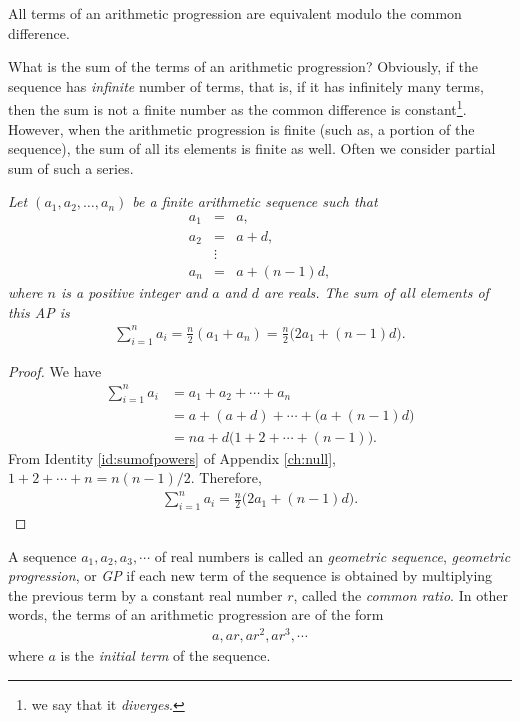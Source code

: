 \documentclass{subfile}
\begin{document}
	\begin{corollary}
		All terms of an arithmetic progression are equivalent modulo the common difference.
	\end{corollary}
What is the sum of the terms of an arithmetic progression? Obviously, if the sequence has \textit{infinite} number of terms, that is, if it has infinitely many terms, then the sum is not a finite number as the common difference is constant\footnote{we say that it \textit{diverges}.}. However, when the arithmetic progression is finite (such as, a portion of the sequence), the sum of all its elements is finite as well. Often we consider partial sum of such a series.
	\begin{theorem}\slshape
		Let $(a_1,a_2,\ldots,a_n)$ be a finite arithmetic sequence such that
			\begin{eqnarray*}
				a_1 & = & a,\\
				a_2 & = & a+d,\\
					& \vdots &\\
				a_n & = & a+ (n-1)d,
			\end{eqnarray*}
		where $n$ is a positive integer and $a$ and $d$ are reals. The sum of all elements of this AP is
			\begin{align*}
				\sum_{i=1}^{n} a_i = \frac{n}{2} \left(a_1+a_n\right) = \frac{n}{2} \big(2a_1 + (n-1)d\big).
			\end{align*}
	\end{theorem}
	
	\begin{proof}
		We have
			\begin{align*}
				\sum_{i=1}^{n} a_i &= a_1 + a_2 + \cdots + a_n \\
								   &= a + (a+d) + \cdots + \Big(a+ (n-1)d\Big)\\
								   &= na + d\Big(1+2+\cdots+ (n-1)\Big).
			\end{align*}
		From Identity \ref{id:sumofpowers} of Appendix \eqref{ch:null}, $1+2+\cdots+n = n(n-1)/2$. Therefore,
			\begin{align*}
				\sum_{i=1}^{n} a_i = \frac{n}{2} \big(2a_1 + (n-1)d\big).
			\end{align*}
	\end{proof}
	
	\begin{definition}
		A sequence $a_1, a_2, a_3, \cdots$ of real numbers is called an \textit{geometric sequence}, \textit{geometric progression}, or \textit{GP} if each new term of the sequence is obtained by multiplying the previous term by a constant real number $r$, called the \textit{common ratio}. In other words, the terms of an arithmetic progression are of the form
			\begin{align*}
				a, ar, ar^2, ar^3, \cdots
			\end{align*}
		where $a$ is the \textit{initial term} of the sequence.
	\end{definition}
	
\end{document}
